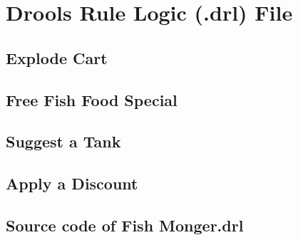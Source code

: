\clearpage
\section{Drools Rule Logic (.drl) File}
\subsection{Explode Cart}
\subsection{Free Fish Food Special}

\clearpage
\subsection{Suggest a Tank}
\subsection{Apply a Discount}
\clearpage
\subsection{Source code of Fish Monger.drl}






\cleardoublepage

